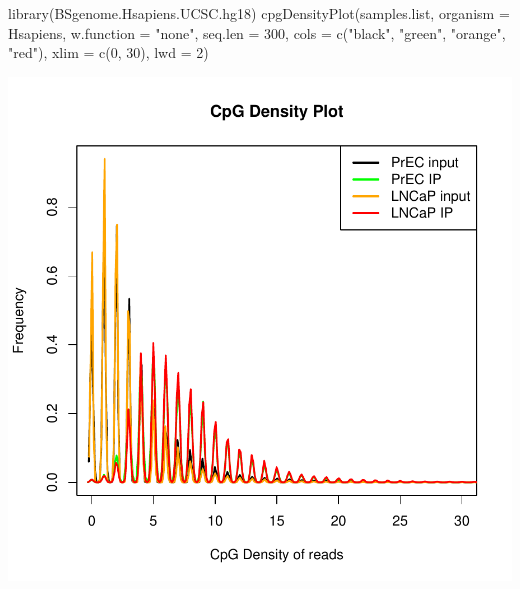 \begin{Schunk}
\begin{Sinput}
 library(BSgenome.Hsapiens.UCSC.hg18)
 cpgDensityPlot(samples.list, organism = Hsapiens, w.function = "none", 
     seq.len = 300, cols = c("black", "green", "orange", "red"), 
     xlim = c(0, 30), lwd = 2)
\end{Sinput}
\end{Schunk}
\includegraphics{qc-cpgPlot}

